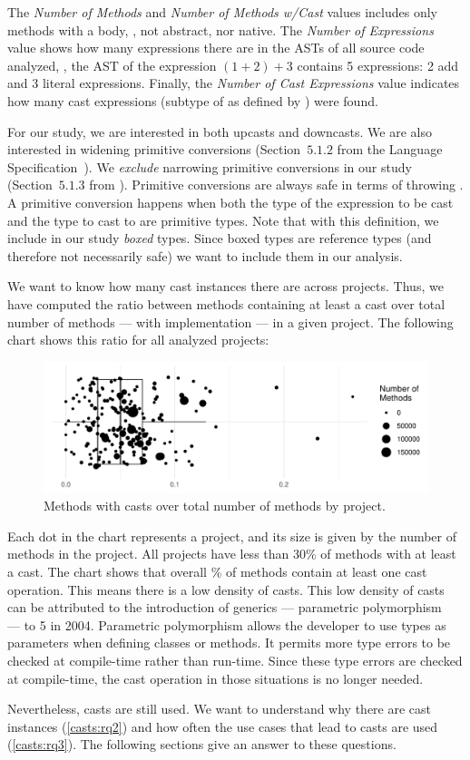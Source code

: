 The \emph{Number of Methods} and \emph{Number of Methods w/Cast} values includes only methods with a body, \ie{}, not abstract, nor native.
The \emph{Number of Expressions} value shows how many expressions there are in the ASTs of all source code analyzed, \eg,
the AST of the expression $(1+2)+3$ contains 5 expressions: 2 add and 3 literal expressions.
Finally, the \emph{Number of Cast Expressions} value indicates how many cast expressions (subtype of  as defined by \ql{}) were found.

For our study, we are interested in both upcasts and downcasts.
We are also interested in widening primitive conversions
(Section~$5.1.2$ from the \java{} Language Specification~\citep{Gosling:2013:JLS:2462622}).
We \emph{exclude} narrowing primitive conversions in our study
(Section~$5.1.3$ from \cite{Gosling:2013:JLS:2462622}).
Primitive conversions are always safe in terms of throwing .
A primitive conversion happens when both the type of the expression to be cast and the type to cast to are primitive types.
Note that with this definition, we include in our study \emph{boxed} types.
Since boxed types are reference types (and therefore not necessarily safe)
we want to include them in our analysis.

We want to know how many cast instances there are across projects.
Thus, we have computed the ratio between methods containing
at least a cast over total number of methods --- with implementation --- in a given project.
The following chart shows this ratio for all analyzed projects:

\begin{figure}[ht!]
\includegraphics[width=0.9\columnwidth]{stats/stats-methodwcastXproject.pdf}
\caption{Methods with casts over total number of methods by project.}
\end{figure}

Each dot in the chart represents a project, and its size is given by the number of methods in the project.
All projects have less than 30\% of methods with at least a cast.
The chart shows that overall \castpercentage{}\% of methods contain at least one cast operation. 
This means there is a low density of casts.
This low density of casts can be attributed to the introduction of generics
--- parametric polymorphism~\citep{cardelliUnderstandingTypesData1985} ---
to \java{} 5 in 2004.
Parametric polymorphism allows the developer to use types as parameters when defining classes or methods. It permits more type errors to be checked at compile-time rather than run-time.
Since these type errors are checked at compile-time,
the cast operation in those situations is no longer needed.

Nevertheless, casts are still used.
We want to understand why there are cast instances (\ref{casts:rq2}) and how often the use cases that lead to casts are used (\ref{casts:rq3}).
The following sections give an answer to these questions.
